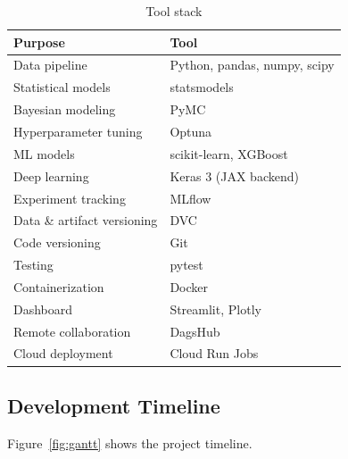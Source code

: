 \documentclass[conference]{IEEEtran}
\begin{document}
\begin{table}[h]
  \centering
  \caption{Tool stack}
  \begin{tabular}{ll}
    \toprule
    Purpose & Tool \\
    \midrule
    Data pipeline & Python, pandas, numpy, scipy \\
    Statistical models & statsmodels \\
    Bayesian modeling & PyMC \\
    Hyperparameter tuning & Optuna \\
    ML models & scikit-learn, XGBoost \\
    Deep learning & Keras 3 (JAX backend) \\
    Experiment tracking & MLflow \\
    Data \& artifact versioning & DVC \\
    Code versioning & Git \\
    Testing & pytest \\
    Containerization & Docker \\
    Dashboard & Streamlit, Plotly \\
    Remote collaboration & DagsHub \\
    Cloud deployment & Cloud Run Jobs \\
    \bottomrule
  \end{tabular}
\end{table}

\subsection{Development Timeline}

Figure~\ref{fig:gantt} shows the project timeline.
\end{document}
